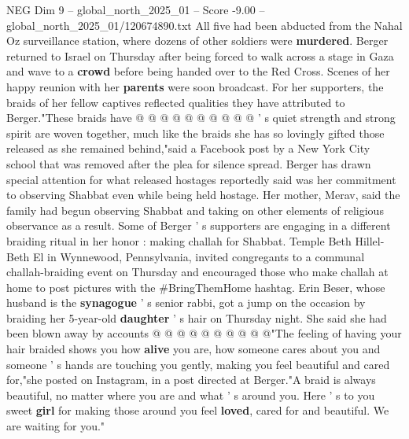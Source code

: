 \begin{textsample}{NEG Dim 9 – global\_north\_2025\_01 – Score -9.00 – global\_north\_2025\_01/120674890.txt}
All five had been abducted from the Nahal Oz surveillance station, where dozens of other soldiers were \textbf{murdered}.
Berger returned to Israel on Thursday after being forced to walk across a stage in Gaza and wave to a \textbf{crowd} before being handed over to the Red Cross.
Scenes of her happy reunion with her \textbf{parents} were soon broadcast.
For her supporters, the braids of her fellow captives reflected qualities they have attributed to Berger."These braids have @ @ @ @ @ @ @ @ @ @ ' s quiet strength and strong spirit are woven together, much like the braids she has so lovingly gifted those released as she remained behind,"said a Facebook post by a New York City school that was removed after the plea for silence spread.
Berger has drawn special attention for what released hostages reportedly said was her commitment to observing Shabbat even while being held hostage.
Her mother, Merav, said the family had begun observing Shabbat and taking on other elements of religious observance as a result.
Some of Berger ' s supporters are engaging in a different braiding ritual in her honor : making challah for Shabbat.
Temple Beth Hillel-Beth El in Wynnewood, Pennsylvania, invited congregants to a communal challah-braiding event on Thursday and encouraged those who make challah at home to post pictures with the \#BringThemHome hashtag.
Erin Beser, whose husband is the \textbf{synagogue} ' s senior rabbi, got a jump on the occasion by braiding her 5-year-old \textbf{daughter} ' s hair on Thursday night.
She said she had been blown away by accounts @ @ @ @ @ @ @ @ @ @"The feeling of having your hair braided shows you how \textbf{alive} you are, how someone cares about you and someone ' s hands are touching you gently, making you feel beautiful and cared for,"she posted on Instagram, in a post directed at Berger."A braid is always beautiful, no matter where you are and what ' s around you.
Here ' s to you sweet \textbf{girl} for making those around you feel \textbf{loved}, cared for and beautiful.
We are waiting for you."

\end{textsample}
